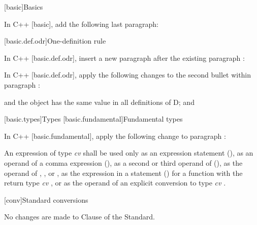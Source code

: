 
[basic]{Basics}

\pnum
In C++ [basic], add the following last paragraph:

\begin{std.txt}
\end{std.txt}



\setcounter{section}{1}
[basic.def.odr]{One-definition rule}

\pnum
In C++ [basic.def.odr], insert a new paragraph after the existing paragraph :

\begin{std.txt}
\end{std.txt}

\pnum
In C++ [basic.def.odr], apply the following changes to the second bullet within paragraph :

\begin{std.txt}
and the object has the same value in all definitions of D; and
\end{std.txt}

\setcounter{section}{8}
[basic.types]{Types}
[basic.fundamental]{Fundamental types}

\pnum
In C++ [basic.fundamental], apply the following change to paragraph :

\begin{std.txt}
An expression of type \emph{cv}  shall be used only as an expression
statement (), as an operand of a comma expression
(), as a second or
third operand of  (), as the operand of ,
,  or , as the
expression in a  statement () for a function with the return type
\emph{cv} , or as the operand of an explicit conversion to type
\emph{cv} .
\end{std.txt}

[conv]{Standard conversions}

No changes are made to Clause \the\value{chapter} of the \Cpp Standard.
